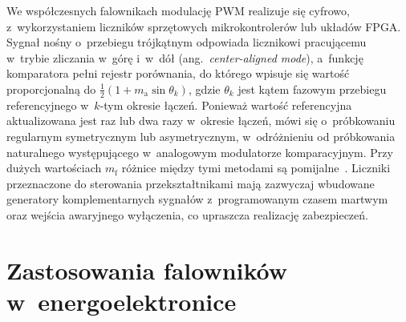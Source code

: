 We współczesnych falownikach modulację PWM realizuje się cyfrowo,
z~wykorzystaniem liczników sprzętowych mikrokontrolerów lub układów FPGA.
Sygnał nośny o~przebiegu trójkątnym odpowiada licznikowi pracującemu
w~trybie zliczania w~górę i~w~dół (ang.~\textit{center-aligned mode}),
a~funkcję komparatora pełni rejestr porównania, do którego wpisuje się
wartość proporcjonalną do $\frac{1}{2}\left(1 + m_\mathrm{a}\sin\theta_k\right)$,
gdzie $\theta_k$ jest kątem fazowym przebiegu referencyjnego w~$k$-tym
okresie łączeń. Ponieważ wartość referencyjna aktualizowana jest raz
lub dwa razy w~okresie łączeń, mówi się o~próbkowaniu regularnym
symetrycznym lub asymetrycznym, w~odróżnieniu od próbkowania naturalnego
występującego w~analogowym modulatorze komparacyjnym. Przy dużych
wartościach $m_\mathrm{f}$ różnice między tymi metodami są
pomijalne~\cite[podrozdz.~3.6]{holmes2003}. Liczniki przeznaczone do sterowania
przekształtnikami mają zazwyczaj wbudowane generatory komplementarnych
sygnałów z~programowanym czasem martwym oraz wejścia awaryjnego
wyłączenia, co upraszcza realizację zabezpieczeń.

\section{Zastosowania falowników w~energoelektronice}
\label{sec: Zastosowania falowników w energoelektronice}

